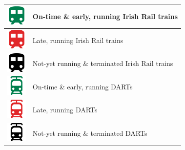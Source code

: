 \documentclass[a4paper,11pt]{report}
\begin{document}
\begin{table}[H]
  \centering
  \begin{tabular}{|>{\centering\arraybackslash}m{1.8cm}|m{10cm}|}
    \hline
    \vspace{2mm}\includegraphics[width=1cm]{../frontend/src/assets/icons/train_ontime.png}\supercite{trainicon} & On-time \& early, running Irish Rail trains\\
    \hline
    \vspace{2mm}\includegraphics[width=1cm]{../frontend/src/assets/icons/train_late.png}\supercite{trainicon}  & Late, running Irish Rail trains\\
    \hline
    \vspace{2mm}\includegraphics[width=1cm]{../frontend/src/assets/icons/train.png}\supercite{trainicon}  & Not-yet running \& terminated Irish Rail trains\\
    \hline

    \vspace{2mm}\includegraphics[width=1cm]{../frontend/src/assets/icons/DARTOnTime.png}\supercite{darticon} & On-time \& early, running DARTs\\
    \hline
    \vspace{2mm}\includegraphics[width=1cm]{../frontend/src/assets/icons/DARTLate.png}\supercite{darticon}  & Late, running DARTs\\
    \hline
    \vspace{2mm}\includegraphics[width=1cm]{../frontend/src/assets/icons/DARTnotRunning.png}\supercite{darticon}  & Not-yet running \& terminated DARTs\\
    \hline



\end{tabular}
\end{table}
\end{document}
